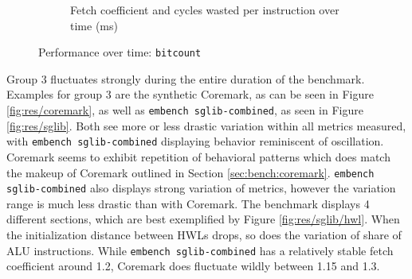 \documentclass[../bachelor_paper.tex]{subfiles}
\begin{document}
\begin{figure}
\begin{subfigure}{0.45\textwidth}
        \caption{Fetch coefficient and cycles wasted per instruction over time (ms)}
        \label{fig:res/bitcount/fetch_waste}
    \end{subfigure}
    \caption{Performance over time: \texttt{bitcount}}
    \label{fig:res/bitcount}
\end{figure}

Group 3 fluctuates strongly during the entire duration of the benchmark. Examples for group 3 are the synthetic Coremark, as can be seen in Figure \ref{fig:res/coremark}, as well as \texttt{embench sglib-combined}, as seen in Figure \ref{fig:res/sglib}. Both see more or less drastic variation within all metrics measured, with \texttt{embench sglib-combined} displaying behavior reminiscent of oscillation. Coremark seems to exhibit repetition of behavioral patterns which does match the makeup of Coremark outlined in Section \ref{sec:bench:coremark}. \texttt{embench sglib-combined} also displays strong variation of metrics, however the variation range is much less drastic than with Coremark. The benchmark displays 4 different sections, which are best exemplified by Figure \ref{fig:res/sglib/hwl}. When the initialization distance between \acp{HWL} drops, so does the variation of share of \ac{ALU} instructions. While \texttt{embench sglib-combined} has a relatively stable fetch coefficient around 1.2, Coremark does fluctuate wildly between 1.15 and 1.3.
\end{document}
